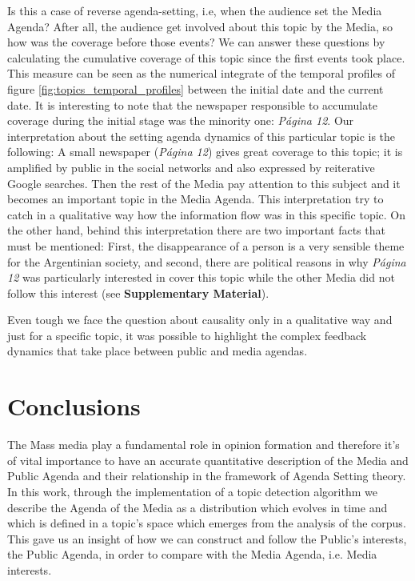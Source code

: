 \documentclass{bmcart}
\begin{document}
\par Is this a case of reverse agenda-setting, i.e, when the audience set the Media Agenda? 
After all,  the audience get involved about this topic by the Media, so how was the coverage before those events?
We can answer these questions by calculating the cumulative coverage of this topic since the first events took place.
This measure can be seen as the numerical integrate of the temporal profiles of figure \ref{fig:topics_temporal_profiles} between the initial date and the current date. 
It is interesting to note that the newspaper responsible to accumulate coverage during the initial stage was the minority one: \emph{P\'agina 12}. 
Our interpretation about the setting agenda dynamics of this particular topic is the following: A small newspaper (\emph{P\'agina 12}) gives great coverage to this topic; it is amplified  by public in the social networks and also expressed  by reiterative Google searches. Then the rest of the Media  pay attention to this subject and it becomes an important topic in the Media Agenda. 
This interpretation try to catch in a qualitative way how the information flow was in this specific topic.
On the other hand, behind this interpretation there are two important facts that must be mentioned: First, the disappearance of a person is a very sensible theme for the Argentinian society, and second, there are political reasons in why \emph{P\'agina 12} was particularly interested in cover this topic while the other Media did not follow this interest (see \textbf{Supplementary Material}).

\par Even tough we face the question about causality only in a qualitative way and just for a specific topic, it was possible to highlight  the complex feedback dynamics that take place between public and media agendas.

\section*{Conclusions}

\par The  Mass media play a fundamental role in opinion formation and therefore it's of vital importance to have an accurate  quantitative description of the Media  and Public Agenda and their relationship in the framework of Agenda Setting theory.
In this work, through the implementation of a topic detection algorithm we describe the Agenda of the Media as a distribution which evolves in time and which is defined in a topic's space which emerges from the analysis of the corpus. This gave us an insight of how we can construct and follow the Public's interests, the Public Agenda, in order to compare with the Media Agenda, i.e. Media interests. 
\end{document}
